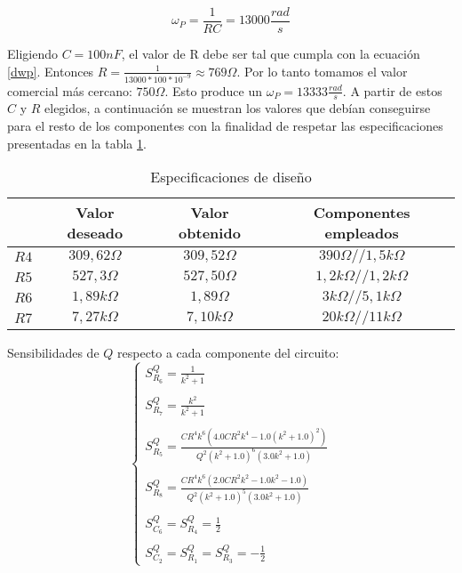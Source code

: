 \begin{equation}
	\omega_P = \frac{1}{RC} = 13000\frac{rad}{s}
	\label{dwp}
\end{equation}

Eligiendo $C = 100nF$, el valor de R debe ser tal que cumpla con la ecuaci\'on \ref{dwp}. Entonces $R = \frac{1}{13000 * 100 *10^{-9}} \approx 769\Omega.$ Por lo tanto tomamos el valor comercial m\'as cercano: $750\Omega$. Esto produce un $\omega_P = 13333 \frac{rad}{s}$. A partir de estos $C$ y $R$ elegidos, a continuaci\'on se muestran los valores que deb\'ian conseguirse para el resto de los componentes con la finalidad de respetar las especificaciones presentadas en la tabla \ref{especificaciones}.

\begin{table}[H]
	\centering
	\begin{tabular}{c c c c}%
		\bfseries  & Valor deseado & Valor obtenido& Componentes empleados \\ \hline
		$R4$ & $309,62\Omega$  & $309,52\Omega$ & $390\Omega // 1,5k\Omega$\\
			$R5$ & $527,3\Omega$  & $527,50\Omega$ & $1,2k\Omega // 1,2k\Omega$\\
				$R6$ & $1,89k\Omega$  & $1,89\Omega$ & $3k\Omega // 5,1k\Omega$\\
				$R7$ & $7,27k\Omega$  & $7,10k\Omega$ & $20k\Omega // 11k\Omega$\\
		\hline
	\end{tabular}
	\caption{Especificaciones de dise\~no}
	\label{especificaciones}
\end{table}

Sensibilidades de $Q$ respecto a cada componente del circuito:
\begin{equation}
\begin{cases}
S^{Q}_{R_6} = \frac{1}{k^{2} + 1}\\ \\
S^{Q}_{R_7} = \frac{k^{2}}{k^{2} + 1}\\ \\
S^{Q}_{R_5} =\frac{C R^{4} k^{6} \left(4.0 C R^{2} k^{4} - 1.0 \left(k^{2} + 1.0\right)^{2}\right)}{Q^{2} \left(k^{2} + 1.0\right)^{6} \left(3.0 k^{2} + 1.0\right)}
 \\ \\
S^{Q}_{R_8} = \frac{C R^{4} k^{6} \left(2.0 C R^{2} k^{2} - 1.0 k^{2} - 1.0\right)}{Q^{2} \left(k^{2} + 1.0\right)^{5} \left(3.0 k^{2} + 1.0\right)}
\\ \\
S^{Q}_{C_6} = S^{Q}_{R_4} =\frac{1}{2} \\ \\
S^{Q}_{C_2} = S^{Q}_{R_1} = S^{Q}_{R_3} =-\frac{1}{2}
\end{cases}
\end{equation}

